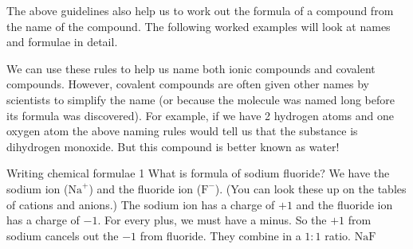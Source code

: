 \label{m38708*id537402}The above guidelines also help us to work out the formula of a compound from the name of the compound. The following worked examples will look at names and formulae in detail.\par 
	\par
\label{m38708*eip-163}We can use these rules to help us name both ionic compounds and covalent compounds. However, covalent compounds are often given other names by scientists to simplify the name (or because the molecule was named long before its formula was discovered). For example, if we have 2 hydrogen atoms and one oxygen atom the above naming rules would tell us that the substance is dihydrogen monoxide. But this compound is better known as water!  \par \label{m38708*eip-254}  
      \begin{wex}{Writing chemical formulae 1}
{What is formula of sodium fluoride? 
}
{
We have the sodium ion ($\text{Na}^{+}$) and the fluoride ion ($\text{F}^{-}$). (You can look these up on the tables of cations and anions.)
The sodium ion has a charge of $+1$ and the fluoride ion has a charge of $-1$.
For every plus, we must have a minus. So the $+1$ from sodium cancels out the $-1$ from fluoride. They combine in a $1:1$ ratio.
$\text{NaF}$
}
\end{wex} 
